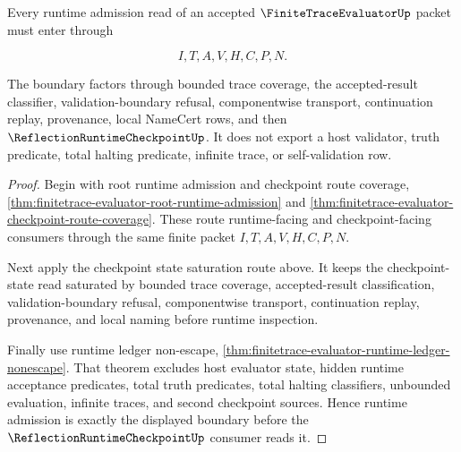 \begin{theorem}
\label{thm:finite-trace-evaluator-runtime-admission-boundary}
Every runtime admission read of an accepted $\FiniteTraceEvaluatorUp$ packet must enter through

$$
I,T,A,V,H,C,P,N.
$$

The boundary factors through bounded trace coverage, the accepted-result classifier, validation-boundary refusal, componentwise transport, continuation replay, provenance, local NameCert rows, and then $\ReflectionRuntimeCheckpointUp$. It does not export a host validator, truth predicate, total halting predicate, infinite trace, or self-validation row.
\end{theorem}
\begin{proof}
Begin with root runtime admission and checkpoint route coverage, \autoref{thm:finitetrace-evaluator-root-runtime-admission} and \autoref{thm:finitetrace-evaluator-checkpoint-route-coverage}. These route runtime-facing and checkpoint-facing consumers through the same finite packet $I,T,A,V,H,C,P,N$.

Next apply the checkpoint state saturation route above. It keeps the checkpoint-state read saturated by bounded trace coverage, accepted-result classification, validation-boundary refusal, componentwise transport, continuation replay, provenance, and local naming before runtime inspection.

Finally use runtime ledger non-escape, \autoref{thm:finitetrace-evaluator-runtime-ledger-nonescape}. That theorem excludes host evaluator state, hidden runtime acceptance predicates, total truth predicates, total halting classifiers, unbounded evaluation, infinite traces, and second checkpoint sources. Hence runtime admission is exactly the displayed boundary before the $\ReflectionRuntimeCheckpointUp$ consumer reads it.
\end{proof}
